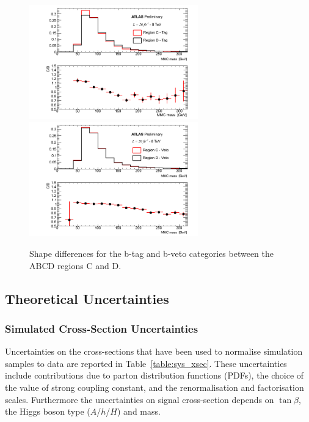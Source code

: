 \begin{figure}[tp]
	\begin{center}
	\includegraphics[width=0.65\textwidth]{figure/QCD/shape_tag.png}
	\includegraphics[width=0.65\textwidth]{figure/QCD/shape_veto.png}
	\end{center}
	\caption{Shape differences for the b-tag and b-veto categories between the ABCD regions C and D.}
	\label{fig:qcd_shape_unc}
\end{figure}

\subsection{Theoretical Uncertainties}
\label{sec:sys_theory}

\subsubsection{Simulated Cross-Section Uncertainties}
Uncertainties on the cross-sections that have been used to normalise
simulation samples to data are reported in
Table~\ref{table:sys_xsec}. These
uncertainties include contributions due to parton distribution
functions (PDFs), the choice of the value of strong coupling constant,
and the renormalisation and factorisation scales.  Furthermore the
uncertainties on signal cross-section depends on $\tan\beta$, the
Higgs boson type ($A$/$h$/$H$) and mass.

